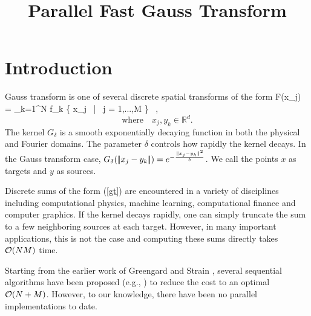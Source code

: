 \documentclass[conference]{IEEEtran}
\begin{document}
\title{Parallel Fast Gauss Transform}  


\author{

\and
{}

\and
{}
}
\date{}
\maketitle

\begin{abstract}

\end{abstract}

\section{Introduction}  \label{s:intro}
Gauss transform is one of several discrete spatial transforms of the form 
%
\beq F(x_j) = \sum_{k=1}^N  f_k \quad {} \quad \{ x_j \, | \, j = 1,...,M \} \, , \label{gt} \eeq
\[\text{where} \quad x_j, y_k \in \mathbb{R}^d. \]
%
The kernel $G_\delta$ is a smooth exponentially decaying function in both the physical
and Fourier domains. The parameter $\delta$ controls how rapidly the kernel decays.  
In the Gauss transform case, $G_\delta (|\!| x_j - y_k |\!|) = e^{-\frac{\|x_j - y_k\|^2}{\delta}}$.  We call the
points $x$ as targets and $y$ as sources.  

Discrete sums of the form (\ref{gt}) are encountered in a variety of disciplines including computational physics, machine learning, computational finance and computer graphics. If the kernel decays rapidly, one can simply truncate the sum to a few neighboring sources at each target. However, in many important applications, this is not the case and computing these sums directly takes $\mathcal{O}(NM)$ time. 

Starting from the earlier work of Greengard and Strain \cite{fgt}, several sequential algorithms have 
been proposed (e.g.,  \cite{greengard98, duraiswami03, tausch09, fggt}) to reduce the 
cost to an optimal $\mathcal{O}(N+M)$. However, to our knowledge, there have been no parallel implementations to date. 
\end{document}
